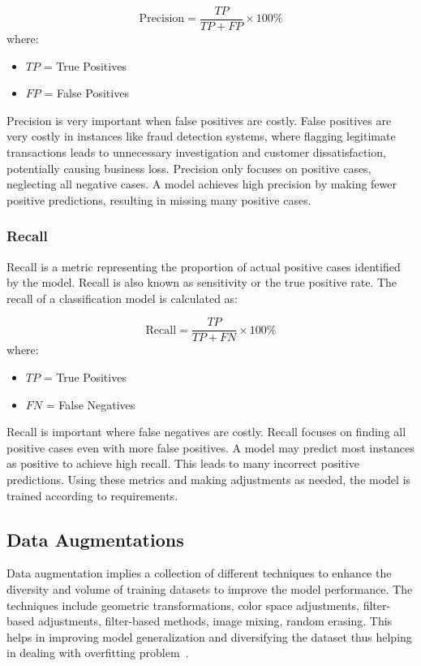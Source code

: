   \begin{equation}
    \text{Precision} = \frac{TP}{TP + FP} \times 100\%
    \label{eq:precision}
  \end{equation}
  where:
  \begin{itemize}
    \item $TP$ = True Positives
    \item $FP$ = False Positives
  \end{itemize}

  Precision is very important when false positives are costly. False positives are very costly in instances like fraud detection systems, where flagging legitimate transactions leads to unnecessary investigation and customer dissatisfaction, potentially causing business loss. Precision only focuses on positive cases, neglecting all negative cases. A model achieves high precision by making fewer positive predictions, resulting in missing many positive cases.

\subsubsection{Recall}
Recall is a metric representing the proportion of actual positive cases identified by the model. Recall is also known as sensitivity or the true positive rate. The recall of a classification model is calculated as:

\begin{equation}
  \text{Recall} = \frac{TP}{TP + FN} \times 100\%
  \label{eq:recall}
\end{equation}
where:
\begin{itemize}
  \item $TP$ = True Positives
  \item $FN$ = False Negatives
\end{itemize}

Recall is important where false negatives are costly. Recall focuses on finding all positive cases even with more false positives. A model may predict most instances as positive to achieve high recall. This leads to many incorrect positive predictions. Using these metrics and making adjustments as needed, the model is trained according to requirements. 

\subsection{Data Augmentations}\label{sec:augmentation}
Data augmentation implies a collection of different techniques  to enhance the diversity and volume of training datasets to improve the model performance. The techniques include geometric transformations, color space adjustments, filter-based adjustments, filter-based methods, image mixing, random erasing. This helps in improving model generalization and diversifying the dataset thus helping in dealing with overfitting problem~\cite{Augmentation}. 

